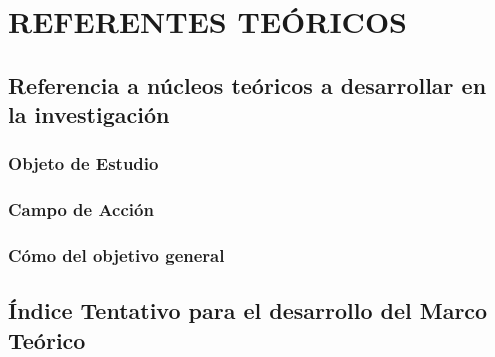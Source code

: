 %
%

\chapter{REFERENTES TE\'ORICOS}


\section{Referencia a n\'ucleos te\'oricos a desarrollar en la investigaci\'on}
\label{cap1:sec:referencia_a_nucleos_teoricos_a_desarrollar_en_la_investigacion}


\subsection{Objeto de Estudio}
\label{cap1:sub:objeto_de_estudio}


\subsection{Campo de Acci\'on}
\label{cap1:sub:campo_de_accion}


\subsection{C\'omo del objetivo general}
\label{cap1:sub:como_del_objetivo_general}

\section{\'{I}ndice Tentativo para el desarrollo del Marco Te\'{o}rico}
\label{cap1:sec:indice_tentativo_para_el_desarrollo_del_marco_teorico}


